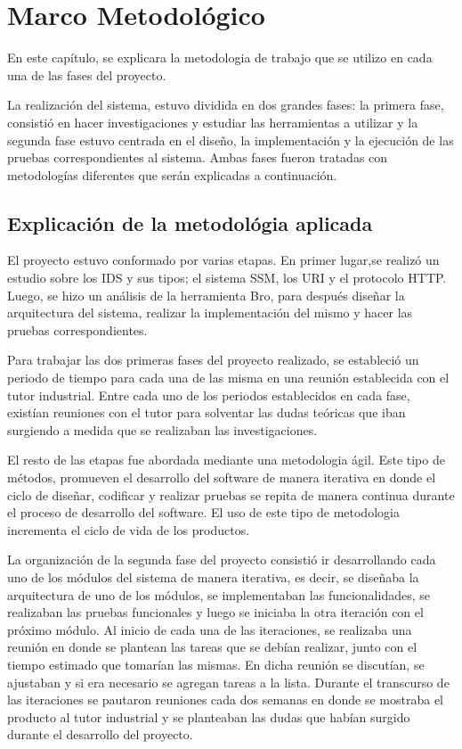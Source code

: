 \chapter{Marco Metodológico}
\label{capituloMetodologico}

En este capítulo, se explicara la metodologia de trabajo que se utilizo en cada una de las fases del proyecto. 

La realización del sistema, estuvo dividida en dos grandes fases: la primera fase, consistió en hacer investigaciones y estudiar las herramientas a utilizar y la segunda fase estuvo centrada en el diseño, la implementación y la ejecución de las pruebas correspondientes al  sistema. Ambas fases fueron tratadas con metodologías diferentes que serán explicadas a continuación.

\section{Explicación de la metodológia aplicada}


El proyecto estuvo conformado por varias etapas. En primer lugar,se realizó un estudio sobre los IDS y sus tipos; el sistema SSM, los URI y el protocolo HTTP. Luego, se hizo un análisis de la herramienta Bro, para después diseñar la arquitectura del sistema, realizar la implementación del mismo y hacer las pruebas correspondientes.

Para trabajar las dos primeras fases del proyecto realizado, se estableció un periodo de tiempo para cada una de las misma en una reunión establecida con el tutor industrial.
Entre cada uno de los periodos establecidos en cada fase, existían reuniones con el tutor para solventar las dudas teóricas que iban surgiendo a medida que se realizaban las investigaciones.

El resto de las etapas fue abordada mediante una metodologia ágil. Este tipo de métodos,  promueven el desarrollo del software de manera iterativa en donde el ciclo de diseñar, codificar y realizar pruebas se repita de manera continua durante el proceso de desarrollo del software. El uso de este tipo de metodologia incrementa el ciclo de vida de los productos\cite{agil}.

La organización de la segunda fase del proyecto consistió ir desarrollando cada uno de los módulos del sistema de manera iterativa, es decir, se diseñaba la arquitectura de uno de los módulos, se implementaban las funcionalidades, se realizaban las pruebas funcionales y luego se iniciaba la otra iteración con el próximo módulo. Al inicio de cada una de las iteraciones, se realizaba una reunión en donde se plantean las tareas que se debían realizar, junto con el tiempo estimado que tomarían las mismas. En dicha reunión se discutían, se ajustaban y si era necesario se agregan tareas a la lista.  Durante el transcurso de las  iteraciones se pautaron reuniones cada dos semanas en donde se mostraba el producto al tutor industrial y se planteaban las dudas que habían surgido durante el desarrollo del proyecto.

